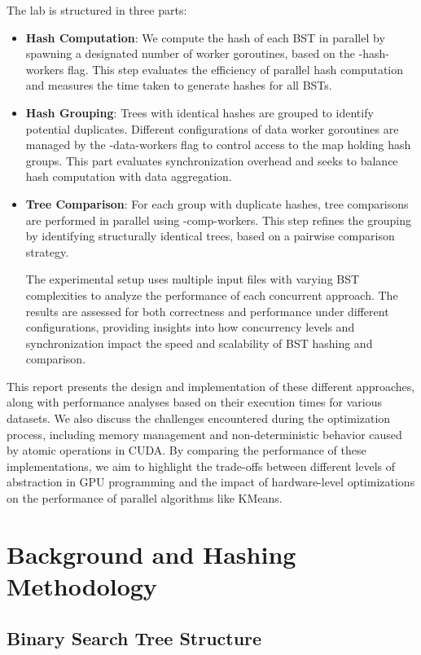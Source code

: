 \documentclass[letterpaper,12pt]{article}
\theoremstyle{remark}
\begin{document}
The lab is structured in three parts:
\begin{itemize}
 \item \textbf{Hash Computation}: We compute the hash of each BST in parallel by spawning a designated number of worker goroutines, based on the -hash-workers flag. This step evaluates the efficiency of parallel hash computation and measures the time taken to generate hashes for all BSTs.

 \item \textbf{Hash Grouping}: Trees with identical hashes are grouped to identify potential duplicates. Different configurations of data worker goroutines are managed by the -data-workers flag to control access to the map holding hash groups. This part evaluates synchronization overhead and seeks to balance hash computation with data aggregation.

 \item \textbf{Tree Comparison}: For each group with duplicate hashes, tree comparisons are performed in parallel using -comp-workers. This step refines the grouping by identifying structurally identical trees, based on a pairwise comparison strategy.

The experimental setup uses multiple input files with varying BST complexities to analyze the performance of each concurrent approach. The results are assessed for both correctness and performance under different configurations, providing insights into how concurrency levels and synchronization impact the speed and scalability of BST hashing and comparison.
\end{itemize}

This report presents the design and implementation of these different approaches, along with performance analyses based on their execution times for various datasets. We also discuss the challenges encountered during the optimization process, including memory management and non-deterministic behavior caused by atomic operations in CUDA. By comparing the performance of these implementations, we aim to highlight the trade-offs between different levels of abstraction in GPU programming and the impact of hardware-level optimizations on the performance of parallel algorithms like KMeans.



\section*{Background and Hashing Methodology}
\subsection{Binary Search Tree Structure}
\end{document}
